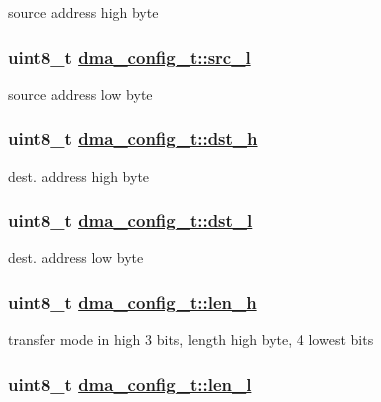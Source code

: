 source address high byte \hypertarget{structdma__config__t_df559811e53bbde7b6dc8cc6abb17e87}{
\subsubsection[src\_\-l]{\setlength{\rightskip}{0pt plus 5cm}uint8\_\-t \hyperlink{structdma__config__t_df559811e53bbde7b6dc8cc6abb17e87}{dma\_\-config\_\-t::src\_\-l}}}
\label{structdma__config__t_df559811e53bbde7b6dc8cc6abb17e87}


source address low byte \hypertarget{structdma__config__t_528a6d47caadb8b50b6bfa73444fb711}{
\subsubsection[dst\_\-h]{\setlength{\rightskip}{0pt plus 5cm}uint8\_\-t \hyperlink{structdma__config__t_528a6d47caadb8b50b6bfa73444fb711}{dma\_\-config\_\-t::dst\_\-h}}}
\label{structdma__config__t_528a6d47caadb8b50b6bfa73444fb711}


dest. address high byte \hypertarget{structdma__config__t_ba26fe8bc8fc23929a766db7afe2e082}{
\subsubsection[dst\_\-l]{\setlength{\rightskip}{0pt plus 5cm}uint8\_\-t \hyperlink{structdma__config__t_ba26fe8bc8fc23929a766db7afe2e082}{dma\_\-config\_\-t::dst\_\-l}}}
\label{structdma__config__t_ba26fe8bc8fc23929a766db7afe2e082}


dest. address low byte \hypertarget{structdma__config__t_c28c429f8e8b40eb50daf4994ecdf056}{
\subsubsection[len\_\-h]{\setlength{\rightskip}{0pt plus 5cm}uint8\_\-t \hyperlink{structdma__config__t_c28c429f8e8b40eb50daf4994ecdf056}{dma\_\-config\_\-t::len\_\-h}}}
\label{structdma__config__t_c28c429f8e8b40eb50daf4994ecdf056}


transfer mode in high 3 bits, length high byte, 4 lowest bits \hypertarget{structdma__config__t_a4bfe298c22cedde28a40bd00d1db608}{
\subsubsection[len\_\-l]{\setlength{\rightskip}{0pt plus 5cm}uint8\_\-t \hyperlink{structdma__config__t_a4bfe298c22cedde28a40bd00d1db608}{dma\_\-config\_\-t::len\_\-l}}}
\label{structdma__config__t_a4bfe298c22cedde28a40bd00d1db608}


